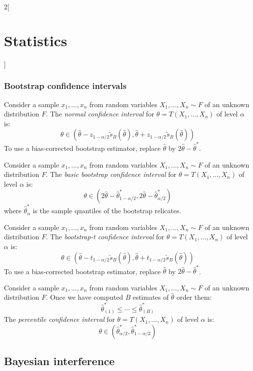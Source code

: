 \documentclass[../../../main.tex]{subfiles}
\begin{document}
\begin{multicols}{2}[\section{Statistics}]
  \subsubsection{Bootstrap confidence intervals}
  \begin{definition}
    Consider a sample $x_1,\ldots,x_n$ from \iid random variables $X_1,\ldots,X_n\sim F$ of an unknown distribution $F$. The \emph{normal confidence interval} for $\theta=T(X_1,\ldots,X_n)$ of level $\alpha$ is: $$\theta\in(\hat\theta-z_{1-\alpha/2}\tilde{s}_B(\hat\theta),\hat\theta+z_{1-\alpha/2}\tilde{s}_B(\hat\theta))$$ To use a bias-corrected bootstrap estimator, replace ${\hat\theta}$ by $2{\hat\theta}-{\hat\theta}^*$.
  \end{definition}
  \begin{definition}
    Consider a sample $x_1,\ldots,x_n$ from \iid random variables $X_1,\ldots,X_n\sim F$ of an unknown distribution $F$. The \emph{basic bootstrap confidence interval} for $\theta=T(X_1,\ldots,X_n)$ of level $\alpha$ is: $$\theta\in(2\hat\theta-\hat\theta_{1-\alpha/2}^*,2\hat\theta-\hat\theta_{\alpha/2}^*)$$ where $\hat\theta_\alpha^*$ is the sample quantiles of the bootstrap relicates.
  \end{definition}
  \begin{definition}
    Consider a sample $x_1,\ldots,x_n$ from \iid random variables $X_1,\ldots,X_n\sim F$ of an unknown distribution $F$. The \emph{bootstrap-t confidence interval} for $\theta=T(X_1,\ldots,X_n)$ of level $\alpha$ is: $$\theta\in(\hat\theta-t_{1-\alpha/2}\tilde{s}_B(\hat\theta),\hat\theta+t_{1-\alpha/2}\tilde{s}_B(\hat\theta))$$ To use a bias-corrected bootstrap estimator, replace ${\hat\theta}$ by $2{\hat\theta}-{\hat\theta}^*$.
  \end{definition}
  \begin{definition}
    Consider a sample $x_1,\ldots,x_n$ from \iid random variables $X_1,\ldots,X_n\sim F$ of an unknown distribution $F$. Once we have computed $B$ estimates of $\hat\theta$ order them:
    $${\hat\theta}_{(1)}^*\leq\cdots\leq{\hat\theta}_{(B)}^*$$
    The \emph{percentile confidence interval} for $\theta=T(X_1,\ldots,X_n)$ of level $\alpha$ is: $$\theta\in(\hat\theta_{\alpha/2}^*,\hat\theta_{1-\alpha/2}^*)$$
  \end{definition}
  \subsection{Bayesian interference}

\end{multicols}
\end{document}
